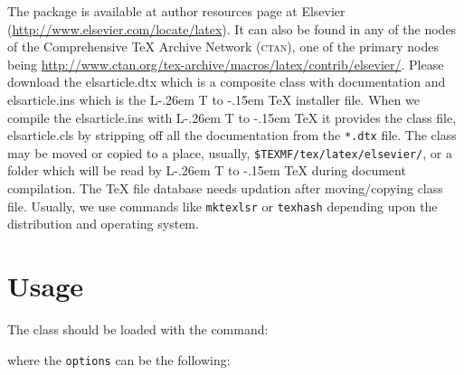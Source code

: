 \documentclass[a4paper,12pt]{article}
\makeatletter
\def\file#1{\textsf{#1}\xspace}
\DeclareRobustCommand{\LaTeX}{L\kern-.26em%
	        {\sbox\z@ T%
	         \vbox to\ht\z@{\hbox{\check@mathfonts
	           \fontsize\sf@size\z@
	           \math@fontsfalse\selectfont
	          A\,}%
	         \vss}%
	        }%
	     \kern-.15em%
	    \TeX}
\makeatother
\begin{document}
	The package is available at author resources page at Elsevier
	(\url{http://www.elsevier.com/locate/latex}).
	It can also be found in any of the nodes of the Comprehensive
	\TeX{} Archive Network (\textsc{ctan}), one of the primary nodes
	being
	\url{http://www.ctan.org/tex-archive/macros/latex/contrib/elsevier/}.
	Please download the \file{elsarticle.dtx} which is a composite
	class with documentation and \file{elsarticle.ins} which is the
	\LaTeX{} installer file. When we compile the
	\file{elsarticle.ins} with \LaTeX{} it provides the class file,
	\file{elsarticle.cls} by
	stripping off all the documentation from the \verb+*.dtx+ file.
	The class may be moved or copied to a place, usually,
	\verb+$TEXMF/tex/latex/elsevier/+, %
	or a folder which will be read                   
	by \LaTeX{} during document compilation.  The \TeX{} file
	database needs updation after moving/copying class file.  Usually,
	we use commands like \verb+mktexlsr+ or \verb+texhash+ depending
	upon the distribution and operating system.
	
	
	\section{Usage}\label{sec:usage}
	The class should be loaded with the command:
	
	
	\noindent where the \verb+options+ can be the following:
	
\end{document}
